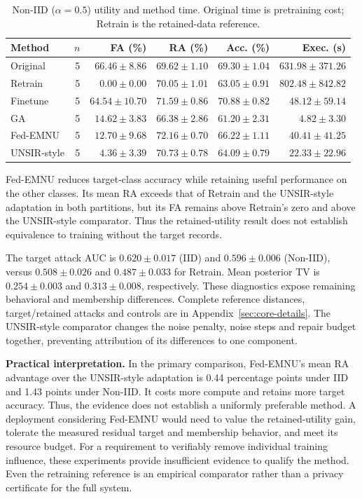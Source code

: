 \documentclass[software,article,submit,moreauthors]{Definitions/mdpi}
\begin{document}
\begin{table}[H]\centering\small
\caption{Non-IID ($\alpha=0.5$) utility and method time. Original time is pretraining cost; Retrain is the retained-data reference.}
\label{tab:noniid-utility}
\begin{tabular}{lrrrrr}\toprule Method & $n$ & FA (\%) & RA (\%) & Acc. (\%) & Exec. (s)\\\midrule
Original & 5 & $66.46 \pm 8.86$ & $69.62 \pm 1.10$ & $69.30 \pm 1.04$ & $631.98 \pm 371.26$\\
Retrain & 5 & $0.00 \pm 0.00$ & $70.05 \pm 1.01$ & $63.05 \pm 0.91$ & $802.48 \pm 842.82$\\
Finetune & 5 & $64.54 \pm 10.70$ & $71.59 \pm 0.86$ & $70.88 \pm 0.82$ & $48.12 \pm 59.14$\\
GA & 5 & $14.62 \pm 3.83$ & $66.38 \pm 2.86$ & $61.20 \pm 2.31$ & $4.82 \pm 3.30$\\
Fed-EMNU & 5 & $12.70 \pm 9.68$ & $72.16 \pm 0.70$ & $66.22 \pm 1.11$ & $40.41 \pm 41.25$\\
UNSIR-style & 5 & $4.36 \pm 3.39$ & $70.73 \pm 0.78$ & $64.09 \pm 0.79$ & $22.33 \pm 22.96$\\
\bottomrule\end{tabular}\end{table}
Fed-EMNU reduces target-class accuracy while retaining useful performance on
the other classes. Its mean RA exceeds that of Retrain and the UNSIR-style
adaptation in both partitions, but its FA remains above Retrain's zero and
above the UNSIR-style comparator. Thus the retained-utility result does not
establish equivalence to training without the target records.

The target attack AUC is $0.620\pm0.017$ (IID) and $0.596\pm0.006$ (Non-IID),
versus $0.508\pm0.026$ and $0.487\pm0.033$ for Retrain. Mean posterior TV is
$0.254\pm0.003$ and $0.313\pm0.008$, respectively. These diagnostics expose
remaining behavioral and membership differences. Complete reference distances,
target/retained attacks and controls are in Appendix~\ref{sec:core-details}.
The UNSIR-style comparator changes the noise penalty, noise steps and repair
budget together, preventing attribution of its differences to one component.

\textbf{Practical interpretation.} In the primary comparison, Fed-EMNU's mean
RA advantage over the UNSIR-style adaptation is 0.44 percentage points under
IID and 1.43 points under Non-IID. It costs more compute and retains more target
accuracy. Thus, the evidence does not establish a uniformly preferable method.
A deployment considering Fed-EMNU would need to value the retained-utility
gain, tolerate the measured residual target and membership behavior, and meet
its resource budget. For a requirement to verifiably remove individual training
influence, these experiments provide insufficient evidence to qualify the
method. Even the retraining reference is an empirical comparator rather than
a privacy certificate for the full system.
\end{document}
